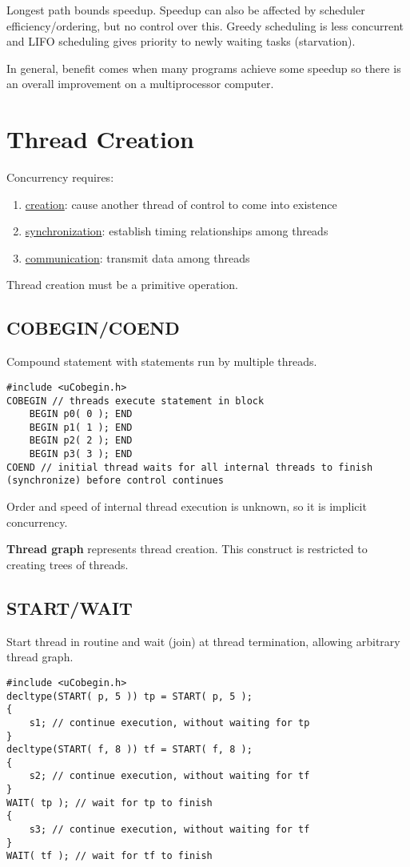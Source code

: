 \documentclass[11pt]{article}
\begin{document}
Longest path bounds speedup. Speedup can also be affected by scheduler efficiency/ordering, but no
control over this.
Greedy scheduling is less concurrent and LIFO scheduling gives priority to newly waiting tasks (starvation).

In general, benefit comes when many programs achieve some speedup so there is an overall improvement
on a multiprocessor computer.
\section{Thread Creation}
\label{sec:org3c2fe81}
Concurrency requires:
\begin{enumerate}
\item \uline{creation}: cause another thread of control to come into existence
\item \uline{synchronization}: establish timing relationships among threads
\item \uline{communication}: transmit data among threads
\end{enumerate}

Thread creation must be a primitive operation.
\subsection{COBEGIN/COEND}
\label{sec:org7d706ba}
Compound statement with statements run by multiple threads.
\begin{verbatim}
#include <uCobegin.h>
COBEGIN // threads execute statement in block
    BEGIN p0( 0 ); END
    BEGIN p1( 1 ); END
    BEGIN p2( 2 ); END
    BEGIN p3( 3 ); END
COEND // initial thread waits for all internal threads to finish (synchronize) before control continues
\end{verbatim}

Order and speed of internal thread execution is unknown, so it is implicit concurrency.

\textbf{Thread graph} represents thread creation.
This construct is restricted to creating trees of threads.
\subsection{START/WAIT}
\label{sec:org3b616b4}
Start thread in routine and wait (join) at thread termination, allowing arbitrary thread graph.

\begin{verbatim}
#include <uCobegin.h>
decltype(START( p, 5 )) tp = START( p, 5 );
{
    s1; // continue execution, without waiting for tp
}
decltype(START( f, 8 )) tf = START( f, 8 );
{
    s2; // continue execution, without waiting for tf
}
WAIT( tp ); // wait for tp to finish
{
    s3; // continue execution, without waiting for tf
}
WAIT( tf ); // wait for tf to finish
\end{verbatim}
\end{document}
